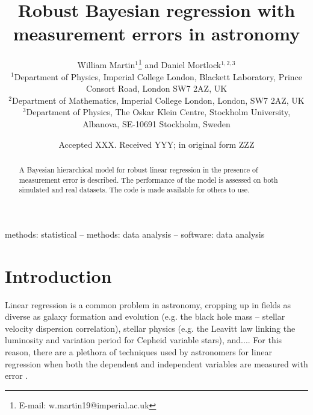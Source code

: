 \documentclass[fleqn,usenatbib]{mnras}
\title[Robust regression in astronomy]{Robust Bayesian regression with measurement errors in astronomy}
\author[W. Martin et al.]{
William Martin$^{1}$\thanks{E-mail: w.martin19@imperial.ac.uk}
and Daniel Mortlock$^{1,2,3}$
\\
$^{1}$Department of Physics, Imperial College London, Blackett Laboratory, Prince Consort Road, London SW7 2AZ, UK\\
$^{2}$Department of Mathematics, Imperial College London, London, SW7 2AZ, UK\\
$^{3}$Department of Physics, The Oskar Klein Centre, Stockholm University, Albanova, SE-10691 Stockholm, Sweden
}
\date{Accepted XXX. Received YYY; in original form ZZZ}
\begin{document}
\label{firstpage}
\pagerange{\pageref{firstpage}--\pageref{lastpage}}
\maketitle

\begin{abstract}
A Bayesian hierarchical model for robust linear regression in the presence of measurement error is described.
The performance of the model is assessed on both simulated and real datasets.
The code is made available for others to use.
\end{abstract}

\begin{keywords}
methods: statistical -- methods: data analysis -- software: data analysis
\end{keywords}



\section{Introduction}
\label{sec:intro}









Linear regression is a common problem in astronomy, cropping up in fields as
diverse as {\color{red} galaxy formation and evolution (e.g. the black hole
mass -- stellar velocity dispersion correlation), stellar physics (e.g. the
Leavitt law linking the luminosity and variation period for Cepheid variable
stars), and...}. For this reason, there are a plethora of techniques used by
astronomers for linear regression when both the dependent and independent
variables are measured with error \citep[e.g.][]{Press:1992, Akritas:1996,
Tremaine:2002, Kelly:2007}.
\end{document}
